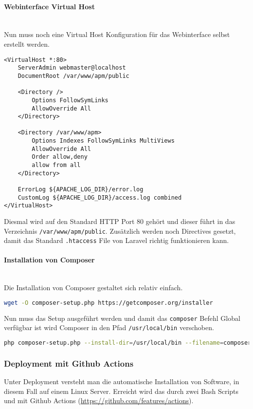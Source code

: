 \paragraph{Webinterface Virtual Host}\mbox{}\\

Nun muss noch eine Virtual Host Konfiguration für das Webinterface selbst erstellt werden.

\begin{lstlisting}[caption={apm.conf}]
  <VirtualHost *:80>
	ServerAdmin webmaster@localhost
	DocumentRoot /var/www/apm/public
        
	<Directory />
		Options FollowSymLinks
		AllowOverride All
	</Directory>

	<Directory /var/www/apm>
		Options Indexes FollowSymLinks MultiViews
		AllowOverride All
		Order allow,deny
		allow from all
	</Directory>

	ErrorLog ${APACHE_LOG_DIR}/error.log
	CustomLog ${APACHE_LOG_DIR}/access.log combined
</VirtualHost>
\end{lstlisting}

Diesmal wird auf den Standard HTTP Port 80 gehört und dieser führt in das Verzeichnis \verb|/var/www/apm/public|. Zusätzlich werden noch Directives gesetzt, damit das Standard \verb|.htaccess| File von Laravel richtig funktionieren kann.

\paragraph{Installation von Composer}\mbox{}\\

Die Installation von Composer gestaltet sich relativ einfach.

\begin{lstlisting}[caption={Download Composer Installer}, language=bash]
  wget -O composer-setup.php https://getcomposer.org/installer
\end{lstlisting}

Nun muss das Setup ausgeführt werden und damit das \verb|composer| Befehl Global verfügbar ist wird Composer in den Pfad \verb|/usr/local/bin| verschoben.

\begin{lstlisting}[caption={Composer Setup}, language=bash]
  php composer-setup.php --install-dir=/usr/local/bin --filename=composer
\end{lstlisting}

\subsubsection{Deployment mit Github Actions}
Unter Deployment versteht man die automatische Installation von Software, in diesem Fall auf einem Linux Server. Erreicht wird das durch zwei Bash Scripts und mit Github Actions (\url{https://github.com/features/actions}).

